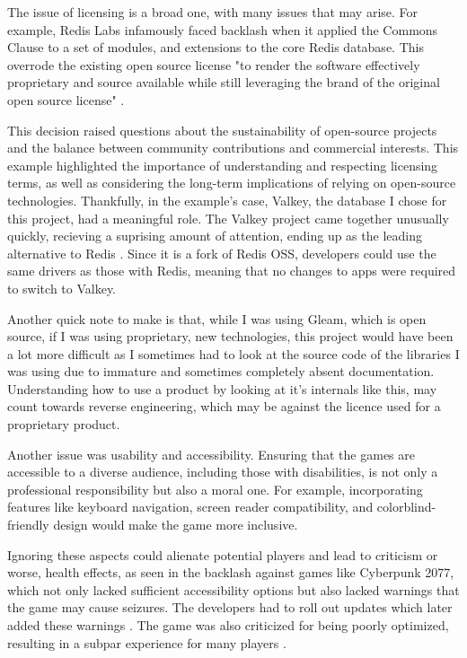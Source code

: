 \documentclass[]{final}
\begin{document}
The issue of licensing is a broad one, with many issues that may arise.
For example, Redis Labs infamously faced backlash when it applied
the Commons Clause to a set of modules, and extensions to the core Redis database.
This overrode the existing open source license "to render the
software effectively proprietary and source available while still leveraging
the brand of the original open source license" \cite{ogrady_post-valkey_2024}.

This decision raised questions about the sustainability of open-source projects
and the balance between community contributions and commercial interests.
This example highlighted the importance of understanding
and respecting licensing terms, as well as considering the long-term
implications of relying on open-source technologies. Thankfully, in the example's
case, Valkey, the database I chose for this project, had a meaningful role.
The Valkey project came together unusually quickly, recieving a suprising amount
of attention, ending up as the leading alternative to Redis \cite{ogrady_post-valkey_2024}. Since it is a fork
of Redis OSS, developers could use the same drivers as those with Redis, meaning
that no changes to apps were required to switch to Valkey.

Another quick note to make is that, while I was using Gleam, which is open source,
if I was using proprietary, new technologies, this project would have been a lot
more difficult as I sometimes had to look at the source code of the libraries I was using
due to immature and sometimes completely absent documentation. Understanding how
to use a product by looking at it's internals like this, may count towards
reverse engineering, which may be against the licence used for a proprietary
product.

Another issue was usability and accessibility.
Ensuring that the games are accessible to a diverse
audience, including those with disabilities, is not only a professional
responsibility but also a moral one. For example, incorporating features like
keyboard navigation, screen reader compatibility, and colorblind-friendly
design would make the game more inclusive.

Ignoring these aspects could
alienate potential players and lead to criticism or worse, health effects, as
seen in the backlash against games like Cyberpunk 2077, which not only lacked
sufficient accessibility options but also lacked warnings that the game
may cause seizures. The developers had to roll out updates which later added
these warnings \cite{carpenter_cyberpunk_2020}.
The game was also criticized for being poorly optimized,
resulting in a subpar experience for many players \cite{noauthor_cyberpunk_nodate, James_cyber_perm}.
\end{document}
